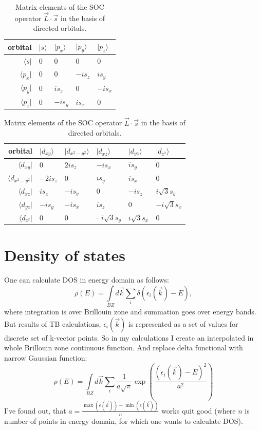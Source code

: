 \begin{table}[h!]
\begin{tabularx}{\textwidth}{|r| X X X X|}
\hline
orbital & $|s \rangle$ & $|p_x \rangle$ & $|p_y \rangle$ & $|p_z \rangle$ \\ \hline
$\langle s|$ & 0 & 0 & 0 & 0 \\
$\langle p_x|$ & 0 & 0 & $- i s_z$ & $i s_y$ \\
$\langle p_y|$ & 0 & $i s_{z} $ & 0 & $- i s_{x} $ \\
$\langle p_z|$ & 0 & $-i s_y$ & $i s_{x} $ & 0 \\
\hline
\end{tabularx}
\newline
\vspace*{0.5 cm}
\newline
\begin{tabularx}{\textwidth}{|r| X X X X X|}
\hline
orbital & $|d_{xy} \rangle$ & $|d_{x^2-y^2}	\rangle$ & $|d_{xz} \rangle$ & $|d_{yz} \rangle$ & $|d_{z^2} \rangle $ \\ \hline
$\langle d_{xy}|$ & 0 & $2 i s_z $ & $-i s_x $ & $i s_y$ & 0\\
$\langle d_{x^2 - y^2}|$ & $-2 i s_z$ & $0$ & $i s_{y} $ & $i s_x $ & 0\\
$\langle d_{xz}|$ & $i s_x$ & $- i s_{y} $ & 0 & $-i s_{z} $ & $i \sqrt{3} s_y$\\
$\langle d_{yz}|$ & $- i s_y $ & $ - i s_x$ & $i s_{z} $ & $0$ & $-i \sqrt{3} s_x $\\
$\langle d_{z^2}|$ & 0 & 0 & - $i \sqrt{3} s_y$ & $i \sqrt{3} s_{x} $ & $0$\\
\hline
\end{tabularx}
\caption{Matrix elements of the SOC operator $\vec{L} \cdot \vec{s}$ in the basis of directed orbitals.}
\label{tab:soc2}
\end{table}

\newpage
\section{Density of states}
One can calculate DOS in energy domain as follows: 
\begin{equation}
	\rho(E) = \int\limits_{BZ} d\vec{k} \sum\limits_i \delta(\epsilon_i(\vec{k}) - E),
\end{equation}
where integration is over Brillouin zone and summation goes over energy bands. But results of TB calculations, $\epsilon_i(\vec{k})$ is represented as a set of values for discrete set of k-vector points. So in my calculations I create an interpolated in whole Brillouin zone continuous function. And replace delta functional with narrow Gaussian function:
\begin{equation}  \label{eq:dos}
	\rho(E) = \int\limits_{BZ} d\vec{k} \sum\limits_i \frac{1}{a\sqrt{\pi}} \exp\left(\frac{(\epsilon_i(\vec{k}) - E)^2}{a^2}\right)
\end{equation}
I've found out, that $a = \frac{\max(\epsilon(\vec{k})) - \min(\epsilon(\vec{k}))}{n}$ works quit good (where $n$ is number of points in energy domain, for which one wants to calculate DOS).

